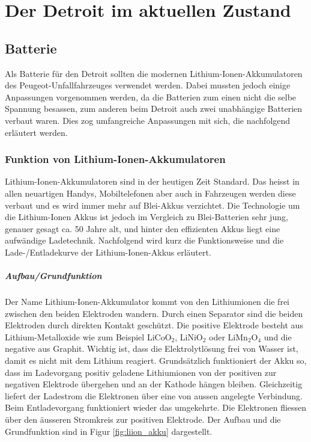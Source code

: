 \chapter{Der Detroit im aktuellen Zustand}

\section{Batterie}
Als Batterie für den Detroit sollten die modernen Lithium-Ionen-Akkumulatoren des Peugeot-Unfallfahrzeuges verwendet werden. Dabei mussten jedoch einige Anpassungen vorgenommen werden, da die Batterien zum einen nicht die selbe Spannung besassen, zum anderen beim Detroit auch zwei unabhängige Batterien verbaut waren. Dies zog umfangreiche Anpassungen mit sich, die nachfolgend erläutert werden.

\subsection{Funktion von Lithium-Ionen-Akkumulatoren} \label{kap_liion}

Lithium-Ionen-Akkumulatoren sind in der heutigen Zeit Standard. Das heisst in allen neuartigen Handys, Mobiltelefonen aber auch in Fahrzeugen werden diese verbaut und es wird immer mehr auf Blei-Akkus verzichtet. Die Technologie um die Lithium-Ionen Akkus ist jedoch im Vergleich zu Blei-Batterien sehr jung, genauer gesagt ca. 50 Jahre alt, und hinter den effizienten Akkus liegt eine aufwändige Ladetechnik. Nachfolgend wird kurz die Funktionsweise und die Lade-/Entladekurve der Lithium-Ionen-Akkus erläutert.

\paragraph{Aufbau/Grundfunktion}

Der Name Lithium-Ionen-Akkumulator kommt von den Lithiumionen die frei zwischen den beiden Elektroden wandern. Durch einen Separator sind die beiden Elektroden durch direkten Kontakt geschützt. Die positive Elektrode besteht aus Lithium-Metalloxide wie zum Beispiel LiCoO$_2$, LiNiO$_2$ oder LiMn$_2$O$_4$ und die negative aus Graphit. Wichtig ist, dass die Elektrolytlösung frei von Wasser ist, damit es nicht mit dem Lithium reagiert.
Grundsätzlich funktioniert der Akku so, dass im Ladevorgang positiv geladene Lithiumionen von der positiven zur negativen Elektrode übergehen und an der Kathode hängen bleiben. Gleichzeitig liefert der Ladestrom die Elektronen über eine von aussen angelegte Verbindung. Beim Entladevorgang funktioniert wieder das umgekehrte. Die Elektronen fliessen über den äusseren Stromkreis zur positiven Elektrode. Der Aufbau und die Grundfunktion sind in Figur \ref{fig:liion_akku} dargestellt. \cite{liion_akku_aufbau_funktion2}

